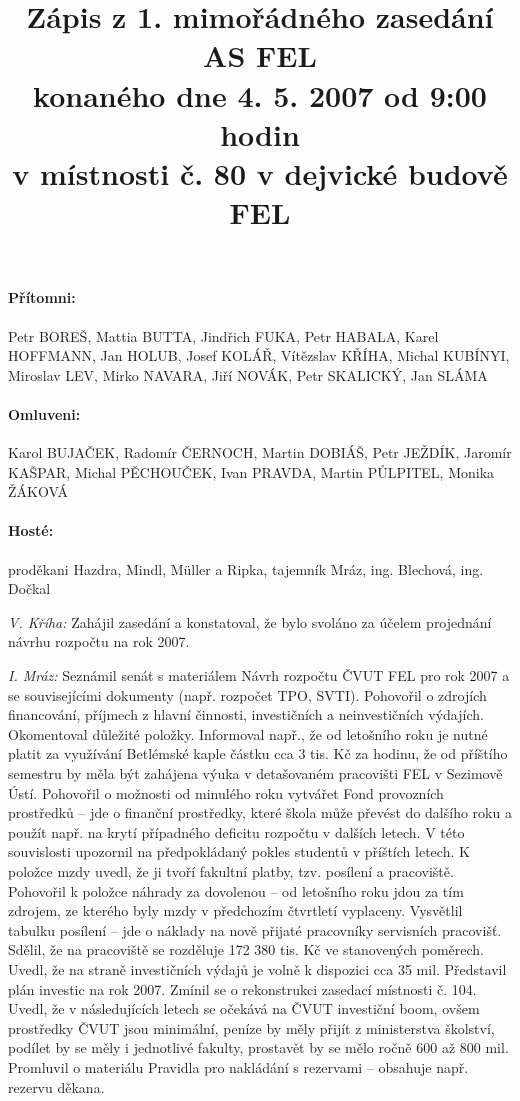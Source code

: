 \documentclass[a4paper,12pt,notitlepage,oneside]{article}
\title{\textbf{Zápis z 1. mimořádného zasedání AS FEL}\\konaného dne 4. 5. 2007 od 9:00 hodin\\v místnosti č. 80 v dejvické budově FEL}
\author{}\date{}
\begin{document}
\maketitle

\paragraph{Přítomni:} Petr BOREŠ, Mattia BUTTA, Jindřich FUKA, Petr HABALA, Karel HOFFMANN, Jan HOLUB, Josef KOLÁŘ, Vítězslav KŘÍHA, Michal KUBÍNYI, Miroslav LEV, Mirko NAVARA, Jiří NOVÁK, Petr SKALICKÝ, Jan SLÁMA
\paragraph{Omluveni:} Karol BUJAČEK, Radomír ČERNOCH, Martin DOBIÁŠ, Petr JEŽDÍK, Jaromír KAŠPAR, Michal PĚCHOUČEK, Ivan PRAVDA, Martin PŮLPITEL, Monika ŽÁKOVÁ
\paragraph{Hosté:} proděkani Hazdra, Mindl, Müller a Ripka, tajemník Mráz, ing. Blechová, ing. Dočkal

\bigskip

\textit{V. Kříha:} Zahájil zasedání a konstatoval, že bylo svoláno za účelem projednání návrhu rozpočtu na rok 2007.

\textit{I. Mráz:} Seznámil senát s materiálem Návrh rozpočtu ČVUT FEL pro rok 2007 a se souvisejícími dokumenty (např. rozpočet TPO, SVTI). Pohovořil o zdrojích financování, příjmech z hlavní činnosti, investičních a neinvestičních výdajích. Okomentoval důležité položky. Informoval např., že od letošního roku je nutné platit za využívání Betlémské kaple částku cca 3 tis. Kč za hodinu, že od příštího semestru by měla být zahájena výuka v detašovaném pracovišti FEL v Sezimově Ústí. Pohovořil o možnosti od minulého roku vytvářet Fond provozních prostředků – jde o finanční prostředky, které škola může převést do dalšího roku a použít např. na krytí případného deficitu rozpočtu  v dalších letech. V této souvislosti upozornil na předpokládaný pokles studentů v příštích letech. K položce mzdy uvedl, že ji tvoří fakultní platby, tzv. posílení a pracoviště. Pohovořil k položce náhrady za dovolenou – od letošního roku jdou za tím zdrojem, ze kterého byly mzdy v předchozím čtvrtletí vyplaceny. Vysvětlil tabulku posílení – jde o náklady na nově přijaté pracovníky servisních pracovišť. Sdělil, že na pracoviště se rozděluje 172 380 tis. Kč ve stanovených poměrech. Uvedl, že na straně investičních výdajů je volně k dispozici cca 35 mil. Představil plán investic na rok 2007. Zmínil se o rekonstrukci zasedací místnosti č. 104. Uvedl, že v následujících letech se očekává na ČVUT investiční boom, ovšem prostředky ČVUT jsou minimální, peníze by měly přijít z ministerstva školství, podílet by se měly i jednotlivé fakulty, prostavět by se mělo ročně 600 až 800 mil. Promluvil o materiálu Pravidla pro nakládání s rezervami – obsahuje např. rezervu děkana.
\end{document}

